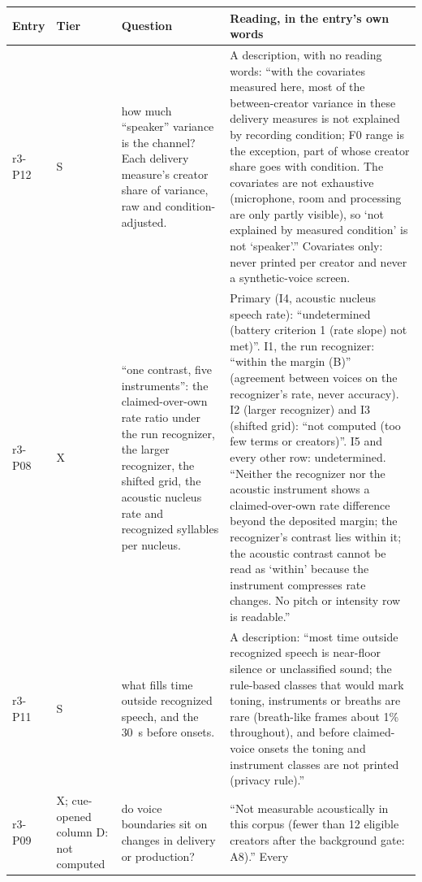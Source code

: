 \begin{table}[tp]
\centering
\footnotesize
\begin{tabular}{@{}>{\raggedright\arraybackslash}p{}>{\raggedright\arraybackslash}p{}>{\raggedright\arraybackslash}p{}p{}@{}}
\toprule
Entry & Tier & Question & Reading, in the entry's own words \\
\midrule
r3-P12 & S & how much ``speaker'' variance is the channel? Each delivery measure's creator share of variance, raw and
condition-adjusted. & A description, with no reading words: ``with the covariates measured here, most of the
between-creator variance in these delivery measures is not explained by recording condition; F0 range is the exception,
part of whose creator share goes with condition. The covariates are not exhaustive (microphone, room and processing are
only partly visible), so `not explained by measured condition' is not `speaker'.'' Covariates only: never printed per
creator and never a synthetic-voice screen. \\
r3-P08 & X & ``one contrast, five instruments'': the claimed-over-own rate ratio under the run recognizer, the larger
recognizer, the shifted grid, the acoustic nucleus rate and recognized syllables per nucleus. & Primary (I4, acoustic
nucleus speech rate): ``undetermined (battery criterion 1 (rate slope) not met)''. I1, the run recognizer: ``within the
margin (B)'' (agreement between voices on the recognizer's rate, never accuracy). I2 (larger recognizer) and I3 (shifted
grid): ``not computed (too few terms or creators)''. I5 and every other row: undetermined. ``Neither the recognizer nor
the acoustic instrument shows a claimed-over-own rate difference beyond the deposited margin; the recognizer's contrast
lies within it; the acoustic contrast cannot be read as `within' because the instrument compresses rate changes. No
pitch or intensity row is readable.'' \\
r3-P11 & S & what fills time outside recognized speech, and the 30~s before onsets. & A description: ``most time
outside recognized speech is near-floor silence or unclassified sound; the rule-based classes that would mark toning,
instruments or breaths are rare (breath-like frames about 1\% throughout), and before claimed-voice onsets the toning and
instrument classes are not printed (privacy rule).'' \\
r3-P09 & X; cue-opened column D: not computed & do voice boundaries sit on changes in delivery or production? &
``Not measurable acoustically in this corpus (fewer than 12 eligible creators after the background gate: A8).'' Every

\end{tabular}
\end{table}
